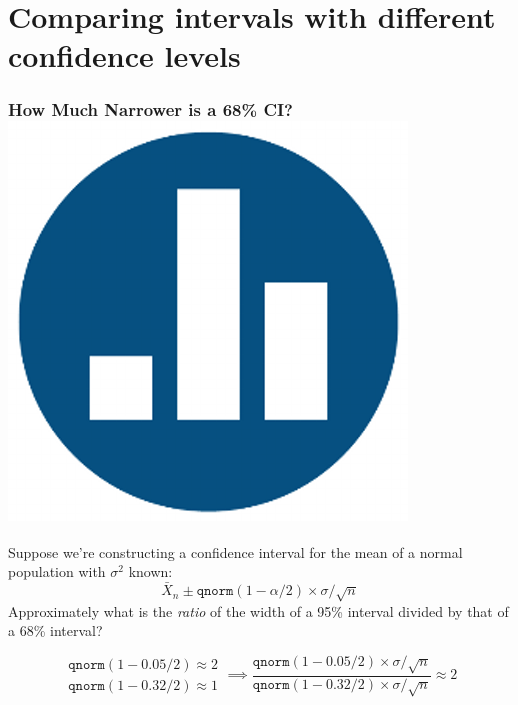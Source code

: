 \section{Comparing intervals with different confidence levels}
\begin{frame}
\frametitle{How Much Narrower is a 68\% CI? \hfill \includegraphics[scale = 0.05]{./images/clicker}}

Suppose we're constructing a confidence interval for the mean of a normal population with $\sigma^2$ known:
$$\bar{X}_n \pm \texttt{qnorm}(1 - \alpha /2) \times \sigma/\sqrt{n}$$
Approximately what is the \emph{ratio} of the width of a 95\% interval divided by that of a 68\% interval? 


\pause


\alert{$$
\boxed{\begin{array}{r}
	\texttt{qnorm}(1 - 0.05/2) \approx 2  \\
	\texttt{qnorm}(1 - 0.32/2)  \approx 1
\end{array}} \implies 
\frac{\texttt{qnorm}(1 - 0.05/2) \times \sigma/\sqrt{n}}{ \texttt{qnorm}(1 - 0.32/2) \times \sigma/\sqrt{n}}\approx 2
$$}

\end{frame}



